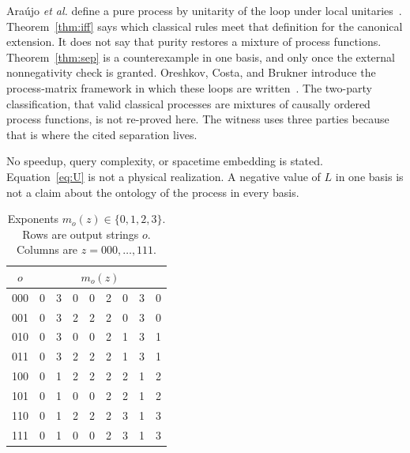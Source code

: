 \documentclass[aps,pra,reprint,amsmath,amssymb,nofootinbib]{revtex4-2}
\begin{document}
Ara\'ujo \emph{et al.} define a pure process by unitarity of the loop under local unitaries~\cite{araujo2017}. Theorem~\ref{thm:iff} says which classical rules meet that definition for the canonical extension. It does not say that purity restores a mixture of process functions. Theorem~\ref{thm:sep} is a counterexample in one basis, and only once the external nonnegativity check is granted. Oreshkov, Costa, and Brukner introduce the process-matrix framework in which these loops are written~\cite{oreshkov2012}. The two-party classification, that valid classical processes are mixtures of causally ordered process functions, is not re-proved here. The witness uses three parties because that is where the cited separation lives.

No speedup, query complexity, or spacetime embedding is stated. Equation~\eqref{eq:U} is not a physical realization. A negative value of \(L\) in one basis is not a claim about the ontology of the process in every basis.

\begin{table}[t]
\caption{Exponents \(m_o(z)\in\{0,1,2,3\}\). Rows are output strings \(o\). Columns are \(z=000,\ldots,111\).}
\label{tab:m}
\begin{ruledtabular}
\begin{tabular}{c cccccccc}
\(o\) & \multicolumn{8}{c}{\(m_o(z)\)}\\
\hline
000 & 0 & 3 & 0 & 0 & 2 & 0 & 3 & 0\\
001 & 0 & 3 & 2 & 2 & 2 & 0 & 3 & 0\\
010 & 0 & 3 & 0 & 0 & 2 & 1 & 3 & 1\\
011 & 0 & 3 & 2 & 2 & 2 & 1 & 3 & 1\\
100 & 0 & 1 & 2 & 2 & 2 & 2 & 1 & 2\\
101 & 0 & 1 & 0 & 0 & 2 & 2 & 1 & 2\\
110 & 0 & 1 & 2 & 2 & 2 & 3 & 1 & 3\\
111 & 0 & 1 & 0 & 0 & 2 & 3 & 1 & 3\\
\end{tabular}
\end{ruledtabular}
\end{table}
\end{document}
